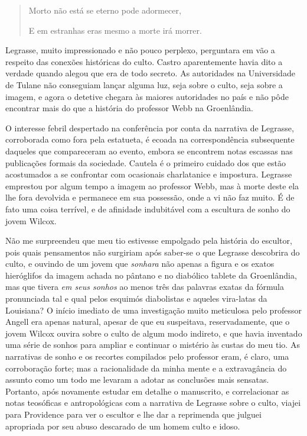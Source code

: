 \begin{quote}
\forceindent{}Morto não está se eterno pode adormecer,

E em estranhas eras mesmo a morte irá morrer.
\end{quote}

Legrasse, muito impressionado e não pouco perplexo, perguntara em vão a
respeito das conexões históricas do culto. Castro aparentemente havia
dito a verdade quando alegou que era de todo secreto. As autoridades na
Universidade de Tulane não conseguiam lançar alguma luz, seja sobre o
culto, seja sobre a imagem, e agora o detetive chegara às maiores
autoridades no país e não pôde encontrar mais do que a história do
professor Webb na Groenlândia.

O interesse febril despertado na conferência por conta da narrativa de
Legrasse, corroborada como fora pela estatueta, é ecoada na
correspondência subsequente daqueles que compareceram ao evento, embora
se encontrem notas escassas nas publicações formais da sociedade.
Cautela é o primeiro cuidado dos que estão acostumados a se confrontar
com ocasionais charlatanice e impostura. Legrasse emprestou por algum
tempo a imagem ao professor Webb, mas à morte deste ela lhe fora
devolvida e permanece em sua possessão, onde a vi não faz muito. É de
fato uma coisa terrível, e de afinidade indubitável com a escultura de
sonho do jovem Wilcox.

Não me surpreendeu que meu tio estivesse empolgado pela história do
escultor, pois quais pensamentos não surgiriam após saber-se o que
Legrasse descobrira do culto, e ouvindo de um jovem que \emph{sonhara}
não apenas a figura e os exatos hieróglifos da imagem achada no pântano
e no diabólico tablete da Groenlândia, mas que tivera \emph{em seus
sonhos} ao menos três das palavras exatas da fórmula pronunciada tal e
qual pelos esquimós diabolistas e aqueles vira-latas da Louisiana? O
início imediato de uma investigação muito meticulosa pelo professor
Angell era apenas natural, apesar de que eu suspeitava, reservadamente,
que o jovem Wilcox ouvira sobre o culto de algum modo indireto, e que
havia inventado uma série de sonhos para ampliar e continuar o mistério
às custas do meu tio. As narrativas de sonho e os recortes compilados
pelo professor eram, é claro, uma corroboração forte; mas a
racionalidade da minha mente e a extravagância do assunto como um todo
me levaram a adotar as conclusões mais sensatas. Portanto, após
novamente estudar em detalhe o manuscrito, e correlacionar as notas
teosóficas e antropológicas com a narrativa de Legrasse sobre o culto,
viajei para Providence para ver o escultor e lhe dar a reprimenda que
julguei apropriada por seu abuso descarado de um homem culto e idoso.

